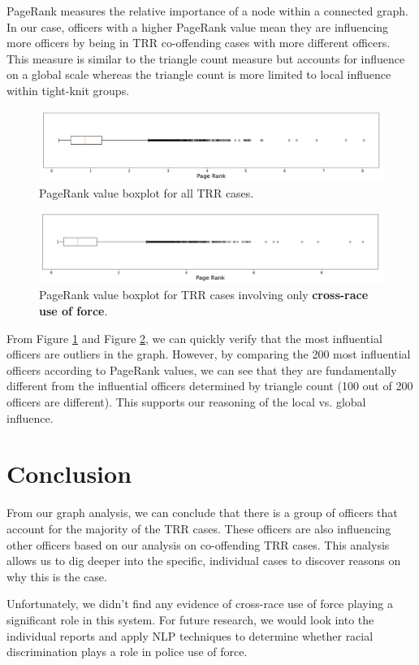 \documentclass[10pt]{article}
\begin{document}
PageRank measures the relative importance of a node within a connected graph. In our case, officers with a higher PageRank value mean they are influencing more officers by being in TRR co-offending cases with more different officers. This measure is similar to the triangle count measure but accounts for influence on a global scale whereas the triangle count is more limited to local influence within tight-knit groups.

\begin{figure}[H]
\centering
\includegraphics[width=\textwidth]{pr}
\caption{PageRank value boxplot for all TRR cases.}
\label{pr}
\end{figure}

\begin{figure}[H]
\centering
\includegraphics[width=\textwidth]{pr_cross_race}
\caption{PageRank value boxplot for TRR cases involving only \textbf{cross-race use of force}.}
\label{pr_cross_race}
\end{figure}

From Figure \ref{pr} and Figure \ref{pr_cross_race}, we can quickly verify that the most influential officers are outliers in the graph. However, by comparing the 200 most influential officers according to PageRank values, we can see that they are fundamentally different from the influential officers determined by triangle count (100 out of 200 officers are different). This supports our reasoning of the local vs. global influence.


\section{Conclusion}

From our graph analysis, we can conclude that there is a group of officers that account for the majority of the TRR cases. These officers are also influencing other officers based on our analysis on co-offending TRR cases. This analysis allows us to dig deeper into the specific, individual cases to discover reasons on why this is the case.

Unfortunately, we didn’t find any evidence of cross-race use of force playing a significant role in this system. For future research, we would look into the individual reports and apply NLP techniques to determine whether racial discrimination plays a role in police use of force.
\end{document}
